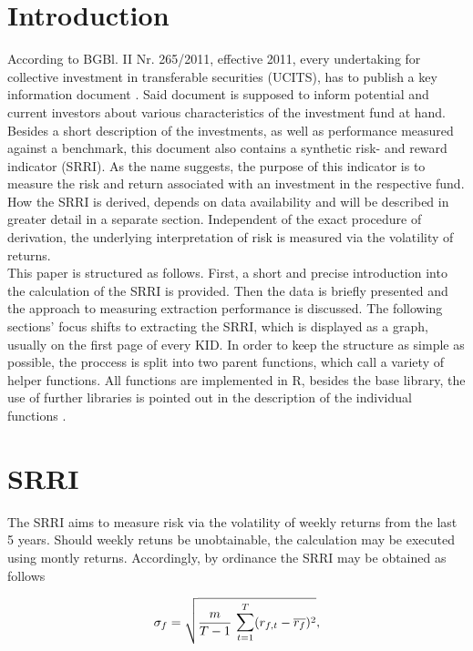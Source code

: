 \documentclass[aodsor,preprint]{imsart}
\numberwithin{equation}{section}
\theoremstyle{plain}
\begin{document}
\section{Introduction}
According to BGBl. II Nr. 265/2011, effective 2011, every undertaking for collective investment in transferable securities (UCITS), has to publish a key information document \citep{BGB1}. Said document is supposed to inform potential and current investors about various characteristics of the investment fund at hand. Besides a short description of the investments, as well as performance measured against a benchmark, this document also contains a synthetic risk- and reward indicator (SRRI). As the name suggests, the purpose of this indicator is to measure the risk and return associated with an investment in the respective fund. How the SRRI is derived, depends on data availability and will be described in greater detail in a separate section. Independent of the exact procedure of derivation, the underlying interpretation of risk is measured via the volatility of returns.\\
This paper is structured as follows. First, a short and precise introduction into the calculation of the SRRI is provided. Then the data is briefly presented and the approach to measuring extraction performance is discussed. The following sections' focus shifts to extracting the SRRI, which is displayed as a graph, usually on the first page of every KID. In order to keep the structure as simple as possible, the proccess is split into two parent functions, which call a variety of helper functions. All functions are implemented in R, besides the base library, the use of further libraries is pointed out in the description of the individual functions \citep{base}.

\newpage

\section{SRRI}

The SRRI aims to measure risk via the volatility of weekly returns from the last 5 years. Should weekly retuns be unobtainable, the calculation may be executed using montly returns. Accordingly, by ordinance the SRRI may be obtained as follows

\[
\sigma_f = \sqrt{\frac{m}{T - 1}\text{ }\mathlarger{\sum}_{t = 1}^{T} (r_{f, t} - \overline{r_f})^2},
\]
\end{document}
